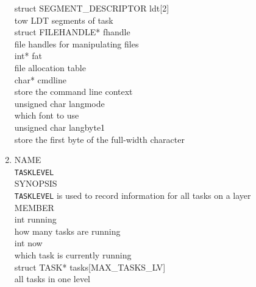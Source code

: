 \documentclass{swfcthesis}
\begin{document}
\begin{enumerate}
  \hspace*{1cm} struct SEGMENT\_DESCRIPTOR ldt[2]\\
  \hspace*{1.5cm}  tow LDT segments of task\\
  \hspace*{1cm}  struct FILEHANDLE* fhandle\\
  \hspace*{1.5cm}  file handles for manipulating files \\
  \hspace*{1cm} int* fat\\
  \hspace*{1.5cm}  file allocation table\\
  \hspace*{1cm} char* cmdline\\
  \hspace*{1.5cm}  store the command line context\\
  \hspace*{1cm} unsigned char langmode\\
  \hspace*{1.5cm}  which font to use\\
  \hspace*{1cm} unsigned char langbyte1\\
  \hspace*{1.5cm}  store the first byte of the full-width character\\

  \item
  NAME \\
  \hspace*{1cm}\texttt{TASKLEVEL} \\
  SYNOPSIS \\
  \hspace*{1cm} \texttt{TASKLEVEL} is used to record information for all tasks on a layer\\
  MEMBER \\
  \hspace*{1cm} int running\\
  \hspace*{1.5cm}  how many tasks are running\\
  \hspace*{1cm} int now\\
  \hspace*{1.5cm} which task is currently running\\
  \hspace*{1cm} struct TASK* tasks[MAX\_TASKS\_LV]\\
  \hspace*{1.5cm} all tasks in one level\\


\end{enumerate}
\end{document}
